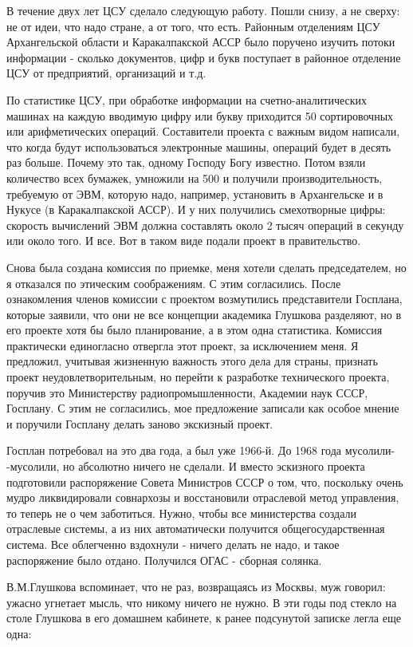 \documentclass{article}
\begin{document}
В течение двух лет ЦСУ сделало следующую работу. Пошли снизу, а не сверху: не от
идеи, что надо стране, а от того, что есть. Районным отделениям ЦСУ
Архангельской области и Каракалпакской АССР было поручено изучить потоки
информации - сколько документов, цифр и букв поступает в районное отделение ЦСУ
от предприятий, организаций и т.д.

По статистике ЦСУ, при обработке информации на счетно-ана\-ли\-ти\-чес\-ких
машинах на каждую вводимую цифру или букву приходится 50 сортировочных или
арифметических операций. Составители проекта с важным видом написали, что когда
будут использоваться электронные машины, операций будет в десять раз больше.
Почему это так, одному Господу Богу известно. Потом взяли количество всех
бумажек, умножили на 500 и получили производительность, требуемую от ЭВМ,
которую надо, например, установить в Архангельске и в Нукусе (в Каракалпакской
АССР). И у них получились смехотворные цифры: скорость вычислений ЭВМ должна
составлять около 2 тысяч операций в секунду или около того. И все. Вот в таком
виде подали проект в правительство.

Снова была создана комиссия по приемке, меня хотели сделать председателем, но я
отказался по этическим соображениям. С этим согласились. После ознакомления
членов комиссии с проектом возмутились представители Госплана, которые заявили,
что они не все концепции академика Глушкова разделяют, но в его проекте хотя бы
было планирование, а в этом одна статистика. Комиссия практически единогласно
отвергла этот проект, за исключением меня. Я предложил, учитывая жизненную
важность этого дела для страны, признать проект неудовлетворительным, но перейти
к разработке технического проекта, поручив это Министерству радиопромышленности,
Академии наук СССР, Госплану. С этим не согласились, мое предложение записали
как особое мнение и поручили Госплану делать заново экскизный проект.

Госплан потребовал на это два года, а был уже 1966-й. До 1968 года мусолили-
-мусолили, но абсолютно ничего не сделали. И вместо эскизного проекта
подготовили распоряжение Совета Министров СССР о том, что, поскольку очень мудро
ликвидировали совнархозы и восстановили отраслевой метод управления, то теперь
не о чем заботиться. Нужно, чтобы все министерства создали отраслевые системы, а
из них автоматически получится общегосударственная система. Все облегченно
вздохнули - ничего делать не надо, и такое распоряжение было отдано. Получился
ОГАС - сборная солянка.

В.М.Глушкова вспоминает, что не раз, возвращаясь из Москвы, муж говорил: ужасно
угнетает мысль, что никому ничего не нужно. В эти годы под стекло на столе
Глушкова в его домашнем кабинете, к ранее подсунутой записке легла еще одна:
\end{document}

